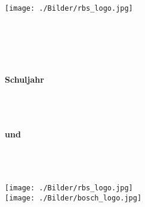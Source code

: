 \begin{titlepage}

\pagestyle{empty}

\begin{minipage}{0.5\textwidth}
\begin{flushleft} \large
\textbf{\MySchuleA} \\
\textbf{\MySchuleB} \\
\textbf{\MyRichtung}
\end{flushleft}
\end{minipage}
%
\begin{minipage}{0.5\textwidth}
\begin{flushright}
\texttt{[image: ./Bilder/rbs\_logo.jpg]}
\end{flushright}
\end{minipage}

\vspace*{8cm} \ \\

\begin{center}
\textbf{{\LARGE \MyTitle}}
\end{center}

\vspace*{9cm} \ \\

\begin{flushleft}
\textbf{\MyAuthor}\\
\textbf{Schuljahr \MySchuljahr}
\end{flushleft}

\cleardoublepage

%
\begin{minipage}{0.5\textwidth}
\begin{flushleft} \large
\textbf{\MySchuleA} \\
\textbf{\MySchuleB} \\
\textbf{\MyRichtung}
\vspace*{3ex}\\
\textbf{und}
\vspace*{3ex} \\
\textbf{\MyFirma}\\
\textbf{\MyAbteilung}\\
\textbf{\MyFirmenStrasse}\\
\textbf{\MyFirmenOrt}
\end{flushleft}
\end{minipage}
%
\begin{minipage}{0.5\textwidth}
\begin{flushright}
\texttt{[image: ./Bilder/rbs\_logo.jpg]}
\vspace*{8ex} \\
\texttt{[image: ./Bilder/bosch\_logo.jpg]}
\end{flushright}
\end{minipage}


\end{titlepage}

